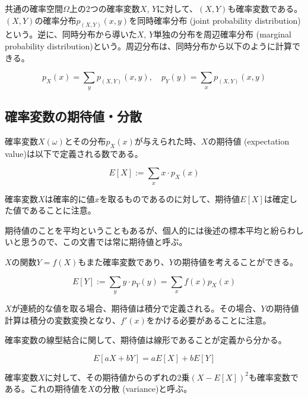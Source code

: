 \documentclass[uplatex,dvipdfmx]{jlreq}
\newcommand\term[1]{\textsf{#1}}
\begin{document}
共通の確率空間$\Omega$上の2つの確率変数$X$, $Y$に対して、$(X, Y)$も確率変数である。$(X, Y)$の確率分布$p_{(X, Y)}(x, y)$を\term{同時確率分布 (joint probability distribution)}という。逆に、同時分布から導いた$X$, $Y$単独の分布を\term{周辺確率分布 (marginal probability distribution)}という。周辺分布は、同時分布から以下のように計算できる。

\begin{equation}
    p_X(x) = \sum_y p_{(X, Y)}(x, y),\quad
    p_Y(y) = \sum_x p_{(X, Y)}(x, y)
\end{equation}

\subsection{確率変数の期待値・分散}

確率変数$X(\omega)$とその分布$p_X(x)$が与えられた時、$X$の\term{期待値 (expectation value)}は以下で定義される数である。

\begin{equation}
    E[X] := \sum_x x \cdot p_X(x)
\end{equation}

確率変数$X$は確率的に値$x$を取るものであるのに対して、期待値$E[X]$は確定した値であることに注意。

\begin{note}
    期待値のことを平均ということもあるが、個人的には後述の標本平均と紛らわしいと思うので、この文書では常に期待値と呼ぶ。
\end{note}

$X$の関数$Y=f(X)$もまた確率変数であり、$Y$の期待値を考えることができる。

\begin{equation}
    E[Y] := \sum_y y \cdot p_Y(y) = \sum_x f(x)p_X(x)
\end{equation}

\begin{note}
    $X$が連続的な値を取る場合、期待値は積分で定義される。その場合、$Y$の期待値計算は積分の変数変換となり、$f'(x)$をかける必要があることに注意。
\end{note}

確率変数の線型結合に関して、期待値は線形であることが定義から分かる。

\begin{equation}
    E[aX + bY] = aE[X] + bE[Y]
\end{equation}

確率変数$X$に対して、その期待値からのずれの2乗$(X-E[X])^2$も確率変数である。これの期待値を$X$の\term{分散 (variance)}と呼ぶ。
\end{document}
